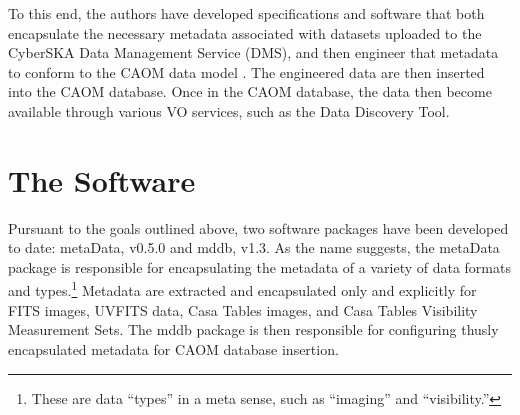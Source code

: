 To this end, the authors have developed  specifications and software
that both encapsulate the necessary metadata associated with datasets
uploaded to the  CyberSKA Data Management Service (DMS), and then
engineer that metadata to conform to the CAOM data
model \citep{dowler_2007}. The engineered data are then inserted into
the CAOM database. Once in the CAOM database, the data then become
available through various VO services, such as the Data Discovery Tool. 

\section{The Software}
Pursuant to the goals outlined above, two software packages have
been developed to date: metaData, v0.5.0 and mddb, v1.3. As the name
suggests, the metaData package is responsible for encapsulating
the metadata of a variety of data formats and types.\footnote{These
  are data ``types'' in a meta sense, such as ``imaging'' and ``visibility.''}
Metadata are extracted and encapsulated only and explicitly for FITS
images, UVFITS data, Casa Tables images, and Casa Tables Visibility
Measurement Sets. The mddb package is then responsible for configuring
thusly encapsulated metadata for CAOM database insertion.


